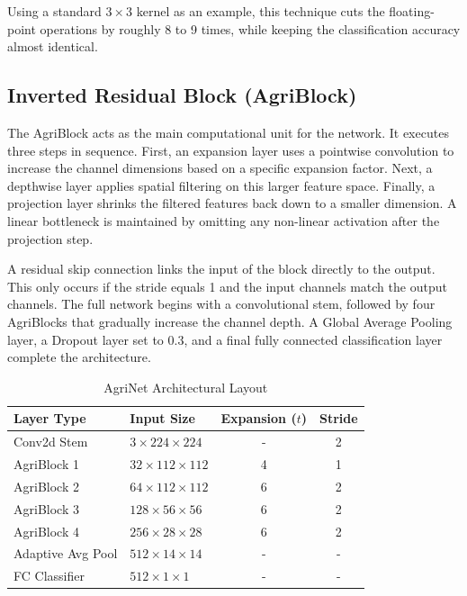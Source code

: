 \documentclass[12pt, a4paper]{report}
\begin{document}
Using a standard $3\times3$ kernel as an example, this technique cuts the floating-point operations by roughly 8 to 9 times, while keeping the classification accuracy almost identical.

\subsection{Inverted Residual Block (AgriBlock)}
The AgriBlock acts as the main computational unit for the network. It executes three steps in sequence. First, an expansion layer uses a pointwise convolution to increase the channel dimensions based on a specific expansion factor. Next, a depthwise layer applies spatial filtering on this larger feature space. Finally, a projection layer shrinks the filtered features back down to a smaller dimension. A linear bottleneck is maintained by omitting any non-linear activation after the projection step.

A residual skip connection links the input of the block directly to the output. This only occurs if the stride equals 1 and the input channels match the output channels. The full network begins with a convolutional stem, followed by four AgriBlocks that gradually increase the channel depth. A Global Average Pooling layer, a Dropout layer set to 0.3, and a final fully connected classification layer complete the architecture.

\begin{table}[h!]
\centering
\caption{AgriNet Architectural Layout}
\vspace{0.3cm}
\begin{tabular}{@{}llcc@{}}
\toprule
\textbf{Layer Type} & \textbf{Input Size} & \textbf{Expansion ($t$)} & \textbf{Stride} \\
\midrule
Conv2d Stem & $3\times224\times224$ & - & 2 \\
AgriBlock 1 & $32\times112\times112$ & 4 & 1 \\
AgriBlock 2 & $64\times112\times112$ & 6 & 2 \\
AgriBlock 3 & $128\times56\times56$ & 6 & 2 \\
AgriBlock 4 & $256\times28\times28$ & 6 & 2 \\
Adaptive Avg Pool & $512\times14\times14$ & - & - \\
FC Classifier & $512\times1\times1$ & - & - \\
\bottomrule
\end{tabular}
\end{table}
\end{document}
